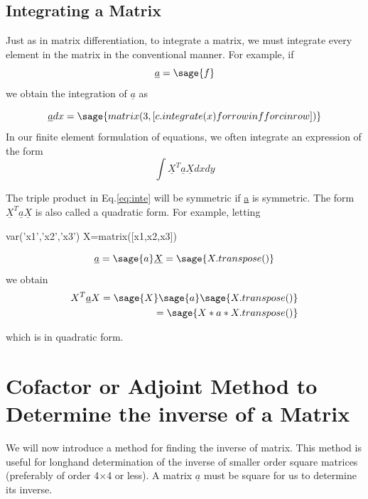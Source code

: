 \documentclass[12pt]{report}
\newcommand{\eref}[1]{
	Eq.\ref{#1}
}
\begin{document}

\subsection{Integrating a Matrix}

Just as in matrix differentiation, to integrate a matrix, we must
integrate every element in the matrix in the conventional manner. For
example, if
$$ \underline{a} = \sage{f}$$
we obtain the integration of $\underline{a}$ as

$$ 
\underline{a}dx = \sage{matrix(3,[c.integrate(x) for row in f for c in row ])
}$$
In our finite element formulation of equations, we often integrate an
expression of the form
\begin{equation}
	\int \underline{X}^T\underline{a}\underline{X} dx dy 
	\label{eq:inte}
\end{equation}

The triple product in \eref{eq:inte} will be symmetric 
if \underline{a} is symmetric. The form 
$\underline{X}^T\underline{a}\underline{X}$ is also called
a quadratic form. For
example, letting
\begin{sagesilent}
	var('x1','x2','x3')
	X=matrix([x1,x2,x3])
\end{sagesilent}

$$\underline{a} = \sage{a} \underline{X}= \sage{X.transpose()}$$
we obtain
\begin{align}
	{X}^T\underline{a}{X} = \sage{X}\sage{a}\sage{X.transpose()} \nonumber\\
	=\sage{X*a*X.transpose()}
\end{align}

which is in quadratic form.


\section[Cofactor or Adjoint Method]{Cofactor or Adjoint Method to Determine 
the inverse of a Matrix}

We will now introduce a method for finding the inverse of matrix. This
method is useful for longhand determination of the inverse of smaller
order square matrices (preferably of order 4$\times$4 or less). A
matrix $\underline{a}$ must be square for us to determine its inverse.
\end{document}
